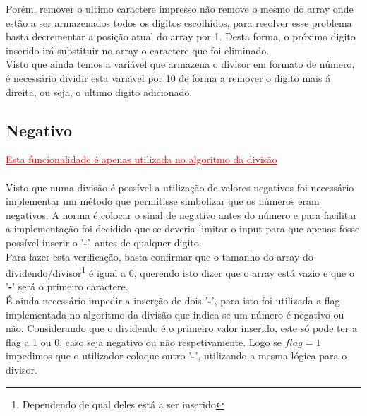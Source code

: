 Porém, remover o ultimo caractere impresso não remove o mesmo do array onde estão a ser armazenados todos os dígitos escolhidos, para resolver esse problema basta decrementar a posição atual do array por 1. Desta forma, o próximo digito inserido irá substituir no array o caractere que foi eliminado. \\

Visto que ainda temos a variável que armazena o divisor em formato de número, é necessário dividir esta variável por 10 de forma a remover o digito mais á direita, ou seja, o ultimo digito adicionado.

\titleformat{\subsection}[runin]
{\normalfont\large\bfseries}{\thesubsection}{1em}{}
\subsection{Negativo} \hfill \textcolor{red}{\underline{Esta funcionalidade é apenas utilizada no algoritmo da divisão}}\\ \\
Visto que numa divisão é possível a utilização de valores negativos foi necessário implementar um método que permitisse simbolizar que os números eram negativos. A norma é colocar o sinal de negativo antes do número e para facilitar a implementação foi decidido que se deveria limitar o input para que apenas fosse possível inserir o '\textbf{-}'. antes de qualquer digito.\\

Para fazer esta verificação, basta confirmar que o tamanho do array do dividendo/divisor\footnote{Dependendo de qual deles está a ser inserido} é igual a 0, querendo isto dizer que o array está vazio e que o '\textbf{-}' será o primeiro caractere.\\

É ainda necessário impedir a inserção de dois '\textbf{-}', para isto foi utilizada a flag implementada no algoritmo da divisão que indica se um número é negativo ou não. Considerando que o dividendo é o primeiro valor inserido, este só pode ter a flag a 1 ou 0, caso seja negativo ou não respetivamente. Logo se $flag = 1$ impedimos que o utilizador coloque outro '\textbf{-}', utilizando a mesma lógica para o divisor.



